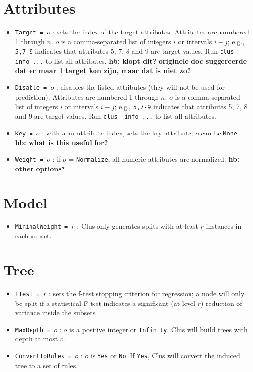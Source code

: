 \documentclass[a4paper]{report}
\begin{document}
\section{Attributes}

\begin{itemize}
\item {\tt Target = $o$} : sets the index of the target attributes.  Attributes are numbered 1 through $n$.  $o$ is a comma-separated list of integers $i$ or intervals $i-j$; e.g., {\tt 5,7-9} indicates that attributes 5, 7, 8 and 9 are target values.  Run {\tt clus -info ...} to list all attributes.
{\bf * hb: klopt dit? originele doc suggereerde dat er maar 1 target kon zijn, maar dat is niet zo?}
\item {\tt Disable = $o$} : disables the listed attributes (they will not be used for prediction).  Attributes are numbered 1 through $n$.  $o$ is a comma-separated list of integers $i$ or intervals $i-j$; e.g., {\tt 5,7-9} indicates that attributes 5, 7, 8 and 9 are target values.  Run {\tt clus -info ...} to list all attributes.
\item {\tt Key = $o$} : with $o$ an attribute index, sets the key attribute; $o$ can be {\tt None}. 
   {\bf * hb: what is this useful for?}
\item {\tt Weight = $o$} : if $o$ = {\tt Normalize}, all numeric attributes are normalized.
   {\bf * hb: other options?}
\end{itemize}

\section{Model}

\begin{itemize}
\item {\tt MinimalWeight = $r$} : Clus only generates splits with at least $r$ instances in each subset.
\end{itemize}

\section{Tree}

\begin{itemize}
\item {\tt FTest = $r$} : sets the f-test stopping criterion for regression; a node will only be split if a statistical F-test indicates a significant (at level $r$) reduction of variance inside the subsets.
\item {\tt MaxDepth = $o$} : $o$ is a positive integer or {\tt Infinity}.  Clus will build trees with depth at  most $o$.
\item {\tt ConvertToRules = $o$} : $o$ is {\tt Yes} or {\tt No}.  If {\tt Yes},  Clus will convert the induced tree to a set of rules.
\end{itemize}
\end{document}
